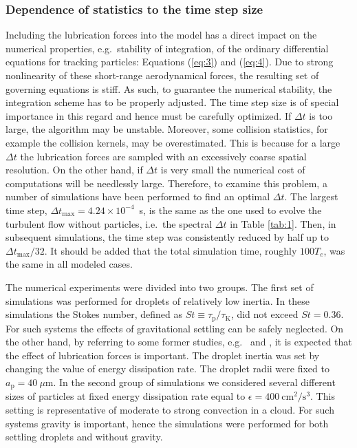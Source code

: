 \documentclass[../thesis.tex]{subfiles}
\begin{document}
\subsubsection{Dependence of statistics to the time step size}
Including the lubrication forces into the model has a direct impact on the numerical properties, e.g.\ stability of integration, of the ordinary differential equations for tracking particles: Equations (\ref{eq:3}) and (\ref{eq:4}). Due to strong nonlinearity of these short-range aerodynamical forces, the resulting set of governing equations is stiff. As such, to guarantee the numerical stability, the integration scheme has to be properly adjusted. The time step size is of special importance in this regard and hence must be carefully optimized. If $\Delta t$ is too large, the algorithm may be unstable. Moreover, some collision statistics, for example the collision kernels, may be overestimated. This is because for a large $\Delta t$ the lubrication forces are sampled with an excessively coarse spatial resolution. On the other hand, if $\Delta t$ is very small the numerical cost of computations will be needlessly large. Therefore, to examine this problem, a number of simulations have been performed to find an optimal $\Delta t$. The largest time step, $\Delta t_\text{max}=4.24\times10^{-4}$~s, is the same as the one used to evolve the turbulent flow without particles, i.e.\ the spectral $\Delta t$ in Table \ref{tab:1}. Then, in subsequent simulations, the time step was consistently reduced by half up to $\Delta t_\text{max}/32$. It should be added that the total simulation time, roughly $100T_e$, was the same in all modeled cases.

The numerical experiments were divided into two groups. The first set of simulations was performed for droplets of relatively low inertia. In these simulations the Stokes number, defined as $St\equiv\tau_\text{p}/ \tau_\text{K}$, did not exceed $St = 0.36$. For such systems the effects of gravitational settling can be safely neglected. On the other hand, by referring to some former studies, e.g.\ \citet{HJ70} and \citet{RWMG11}, it is expected that the effect of lubrication forces is important. The droplet inertia was set by changing the value of energy dissipation rate. The droplet radii were fixed to $a_\text{p} = 40~\mu$m. In the second group of simulations we considered several different sizes of particles at fixed energy dissipation rate equal to $\epsilon = 400~\mathrm{cm^2/s^3}$. This setting is representative of moderate to strong convection in a cloud. For such systems gravity is important, hence the simulations were performed for both settling droplets and without gravity.   
\end{document}
